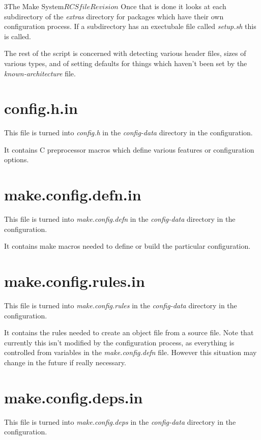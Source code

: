 \begin{cactuspart}{3}{The Make System}{$RCSfile$}{$Revision$}
Once that is done it looks at each subdirectory of the {\em extras}
directory for packages which have their own configuration process.  If a
subdirectory has an exectubale file called {\em setup.sh} this is called.

The rest of the script is concerned with detecting various header files,
sizes of various types, and of setting defaults for things which haven't
been set by the {\em known-architecture} file.

\section{config.h.in}
\label{sec:autoconf:h}

This file is turned into {\em config.h} in the {\em config-data}
directory in the configuration.

It contains C preprocessor macros which define various features or
configuration options.

\section{make.config.defn.in}
\label{sec:autoconf:defn}

This file is turned into {\em make.config.defn} in the {\em config-data}
directory in the configuration.

It contains make macros needed to define or build the particular 
configuration.

\section{make.config.rules.in}
\label{sec:autoconf:rules}

This file is turned into {\em make.config.rules} in the {\em config-data}
directory in the configuration.

It contains the rules needed to create an object file from a source file.
Note that currently this isn't modified by the configuration process, as
everything is controlled from variables in the {\em make.config.defn} file.
However this situation may change in the future if really necessary.

\section{make.config.deps.in}
\label{sec:autoconf:deps}

This file is turned into {\em make.config.deps} in the {\em config-data}
directory in the configuration.


\end{cactuspart}
